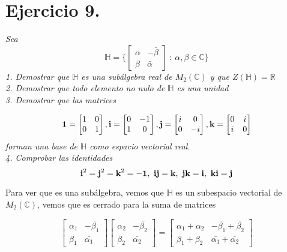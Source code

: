 \section{Ejercicio 9.} \emph{Sea}
\[
  \mathbb{H} = \Big\{ \begin{bmatrix}
    \alpha       &  -\bar{\beta} \\
    \beta       &  \bar{\alpha}
\end{bmatrix} \ : \ \alpha , \beta \in \mathbb{C} \Big\}
\]
\emph{1. Demostrar que \(\mathbb{H}\) es una subálgebra real de
  \(M_2(\mathbb{C})\) y que \(Z(\mathbb{H}) = \mathbb{R}\)}\\
\emph{2. Demostrar que todo elemento no nulo de \(\mathbb{H}\) es una unidad}\\
\emph{3. Demostrar que las matrices}

\[
  \text{\textbf{1}}  = \begin{bmatrix}
    1  &  0 \\
    0  &  1
\end{bmatrix},   \text{\textbf{i}} = \begin{bmatrix}
    0  &  -1 \\
    1  &  0
\end{bmatrix},  \text{\textbf{j}}  = \begin{bmatrix}
    i  &  0 \\
    0  &  -i
\end{bmatrix},   \text{\textbf{k}}  = \begin{bmatrix}
    0  &  i \\
    i  &  0
\end{bmatrix}
\]
\emph{forman una base de \(\mathbb{H}\) como espacio vectorial real.}\\
\emph{4. Comprobar las identidades}
\[
  \text{\textbf{i}} ^2 = \text{\textbf{j}} ^2 = \text{\textbf{k}} ^2 = -\text{\textbf{1}} , \
  \text{\textbf{i}} \text{\textbf{j}}  = \text{\textbf{k}} , \ \text{\textbf{j}} \text{\textbf{k}}  = \text{\textbf{i}} , \ \text{\textbf{k}} \text{\textbf{i}}  = \text{\textbf{j}}
\]

Para ver que es una subálgebra, vemos que \(\mathbb{H}\) es un subespacio
vectorial de \(M_2(\mathbb{C})\), vemos que es cerrado para la suma de matrices

\[
  \begin{bmatrix}
    \alpha_1       &  -\bar{\beta_1} \\
    \beta_1       &  \bar{\alpha_1}
\end{bmatrix} \begin{bmatrix}
    \alpha_2       &  -\bar{\beta_2} \\
    \beta_2       &  \bar{\alpha_2}
\end{bmatrix} = \begin{bmatrix}
    \alpha_1 + \alpha_2 & -\bar{\beta_1} + \bar{\beta_2} \\
    \beta_1 + \beta_2 & \bar{\alpha_1} +\bar{\alpha_2}
\end{bmatrix}
\]

